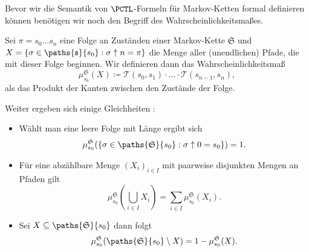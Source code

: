 Bevor wir die Semantik von $\PCTL$-Formeln für Markov-Ketten formal definieren können benötigen wir noch den Begriff des Wahrscheinlichkeitsmaßes.

\begin{definition}[Wahrscheinlichkeitsmaß]
	Sei $\pi = s_0\dots s_n$ eine Folge an Zuständen einer Markov-Kette $\mathfrak{S}$ und $X=\{\sigma\in \paths{\mathfrak{s}}{s_0} : \sigma\uparrow n = \pi\}$ die Menge aller (unendlichen) Pfade, die mit dieser Folge beginnen. Wir definieren dann das Wahrscheinlichkeitsmaß 
	$$\mu^{\mathfrak{S}}_{s_0}(X)\coloneqq\mathcal{T}(s_0,s_1)\cdot \dots \cdot \mathcal{T}(s_{n-1},s_n),$$
	als das Produkt der Kanten zwischen den Zustände der Folge. \cite{hansson1994logic}
\end{definition}

Weiter ergeben sich einige Gleichheiten \cite{hansson1994logic}:
\begin{itemize}
	\item Wählt man eine leere Folge mit Länge ergibt sich
	\begin{equation}\mu^\mathfrak{S}_{s_0}(\{\sigma\in \paths{\mathfrak{S}}{s_0} : \sigma\uparrow 0 = s_0\})=1.\end{equation}
	\item Für eine abzählbare Menge $(X_i)_{i\in I}$ mit paarweise disjunkten Mengen an Pfaden gilt
	\begin{equation}\mu^\mathfrak{S}_{s_0}(\bigcup_{i\in I}X_i) = \sum_{i\in I}\mu^\mathfrak{S}_{s_0}(X_i).\end{equation}
	\item Sei $X\subseteq \paths{\mathfrak{S}}{s_0}$ dann folgt 
	\begin{equation}\mu^\mathfrak{S}_{s_0}(\paths{\mathfrak{S}}{s_0} \setminus X) = 1-\mu^\mathfrak{S}_{s_0}(X).\label{MassUmkehrung}\end{equation}
\end{itemize}


